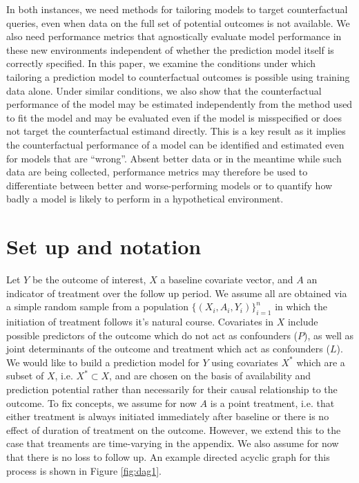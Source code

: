 In both instances, we need methods for tailoring models to target counterfactual queries, even when data on the full set of potential outcomes is not available. We also need performance metrics that agnostically evaluate model performance in these new environments independent of whether the prediction model itself is correctly specified. In this paper, we examine the conditions under which tailoring a prediction model to counterfactual outcomes is possible using training data alone. Under similar conditions, we also show that the counterfactual performance of the model may be estimated independently from the method used to fit the model and may be evaluated even if the model is misspecified or does not target the counterfactual estimand directly. This is a key result as it implies the counterfactual performance of a model can be identified and estimated even for models that are ``wrong''. Absent better data or in the meantime while such data are being collected, performance metrics may therefore be used to differentiate between better and worse-performing models or to quantify how badly a model is likely to perform in a hypothetical environment.


\section{Set up and notation} \label{sec:setup}
Let $Y$ be the outcome of interest, $X$ a baseline covariate vector, and $A$ an indicator of treatment over the follow up period. We assume all are obtained via a simple random sample from a  population $\{(X_i, A_i, Y_i)\}_{i=1}^n$ in which the initiation of treatment follows it's natural course. Covariates in $X$ include possible predictors of the outcome which do not act as confounders ($P$), as well as joint determinants of the outcome and treatment which act as confounders ($L$). We would like to build a prediction model for $Y$ using covariates $X^*$ which are a subset of $X$, i.e. $X^* \subset X$, and are chosen on the basis of availability and prediction potential rather than necessarily for their causal relationship to the outcome. To fix concepts, we assume for now $A$ is a point treatment, i.e. that either treatment is always initiated immediately after baseline or there is no effect of duration of treatment on the outcome. However, we extend this to the case that treaments are time-varying in the appendix. We also assume for now that there is no loss to follow up. An example directed acyclic graph for this process is shown in Figure \ref{fig:dag1}. 

